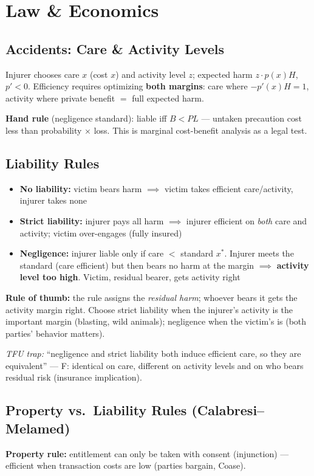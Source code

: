 \section{Law \& Economics}

\subsection{Accidents: Care \& Activity Levels}
Injurer chooses care $x$ (cost $x$) and activity level $z$; expected harm $z \cdot p(x)H$, $p' < 0$. Efficiency requires optimizing \textbf{both margins}: care where $-p'(x)H = 1$, activity where private benefit $=$ full expected harm.

\textbf{Hand rule} (negligence standard): liable iff $B < PL$ --- untaken precaution cost less than probability $\times$ loss. This is marginal cost-benefit analysis as a legal test.

\subsection{Liability Rules}
\begin{itemize}[nosep]
  \item \textbf{No liability:} victim bears harm $\implies$ victim takes efficient care/activity, injurer takes none
  \item \textbf{Strict liability:} injurer pays all harm $\implies$ injurer efficient on \textit{both} care and activity; victim over-engages (fully insured)
  \item \textbf{Negligence:} injurer liable only if care $<$ standard $x^*$. Injurer meets the standard (care efficient) but then bears no harm at the margin $\implies$ \textbf{activity level too high}. Victim, residual bearer, gets activity right
\end{itemize}
\textbf{Rule of thumb:} the rule assigns the \textit{residual harm}; whoever bears it gets the activity margin right. Choose strict liability when the injurer's activity is the important margin (blasting, wild animals); negligence when the victim's is (both parties' behavior matters).

\textit{TFU trap:} ``negligence and strict liability both induce efficient care, so they are equivalent'' --- F: identical on care, different on activity levels and on who bears residual risk (insurance implication).

\subsection{Property vs.\ Liability Rules (Calabresi--Melamed)}
\textbf{Property rule:} entitlement can only be taken with consent (injunction) --- efficient when transaction costs are low (parties bargain, Coase).

